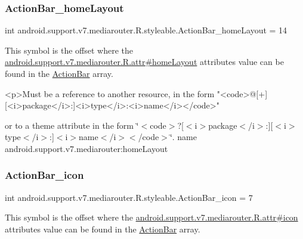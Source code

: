 \subsubsection{\texorpdfstring{Action\+Bar\+\_\+home\+Layout}{ActionBar\_homeLayout}}
{\footnotesize\ttfamily int android.\+support.\+v7.\+mediarouter.\+R.\+styleable.\+Action\+Bar\+\_\+home\+Layout = 14\hspace{0.3cm}{\ttfamily [static]}}

This symbol is the offset where the \hyperlink{classandroid_1_1support_1_1v7_1_1mediarouter_1_1R_1_1attr_ab1808031f49fef5d4045c7311bc2d9f2}{android.\+support.\+v7.\+mediarouter.\+R.\+attr\#home\+Layout} attribute\textquotesingle{}s value can be found in the \hyperlink{classandroid_1_1support_1_1v7_1_1mediarouter_1_1R_1_1styleable_adc4d3c0d096085367f12d025007aa53f}{Action\+Bar} array.

\begin{DoxyVerb}      <p>Must be a reference to another resource, in the form "<code>@[+][<i>package</i>:]<i>type</i>:<i>name</i></code>"
\end{DoxyVerb}
 or to a theme attribute in the form \char`\"{}$<$code$>$?\mbox{[}$<$i$>$package$<$/i$>$\+:\mbox{]}\mbox{[}$<$i$>$type$<$/i$>$\+:\mbox{]}$<$i$>$name$<$/i$>$$<$/code$>$\char`\"{}.  name android.\+support.\+v7.\+mediarouter\+:home\+Layout \mbox{\label{classandroid_1_1support_1_1v7_1_1mediarouter_1_1R_1_1styleable_ac13b4a2a325df9a1fc313d6ed89c2f35}} 
\subsubsection{\texorpdfstring{Action\+Bar\+\_\+icon}{ActionBar\_icon}}
{\footnotesize\ttfamily int android.\+support.\+v7.\+mediarouter.\+R.\+styleable.\+Action\+Bar\+\_\+icon = 7\hspace{0.3cm}{\ttfamily [static]}}

This symbol is the offset where the \hyperlink{classandroid_1_1support_1_1v7_1_1mediarouter_1_1R_1_1attr_a36a78f6af61f38fe96606868a1664662}{android.\+support.\+v7.\+mediarouter.\+R.\+attr\#icon} attribute\textquotesingle{}s value can be found in the \hyperlink{classandroid_1_1support_1_1v7_1_1mediarouter_1_1R_1_1styleable_adc4d3c0d096085367f12d025007aa53f}{Action\+Bar} array.

